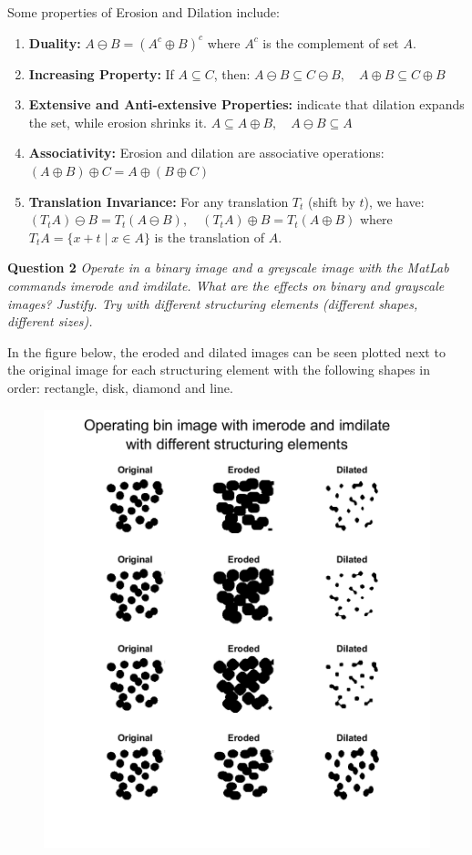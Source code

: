 Some properties of Erosion and Dilation include:
\begin{enumerate}
    \item \textbf{Duality:} 
    $A \ominus B = (A^c \oplus B)^c$ where \( A^c \) is the complement of set \( A \).

    \item \textbf{Increasing Property:} If \( A \subseteq C \), then: 
    $A \ominus B \subseteq C \ominus B, \quad A \oplus B \subseteq C \oplus B$

    \item \textbf{Extensive and Anti-extensive Properties:} indicate that dilation expands the set, while erosion shrinks it.
    $A \subseteq A \oplus B, \quad A \ominus B \subseteq A$ 

    \item \textbf{Associativity:} Erosion and dilation are associative operations: 
    $(A \oplus B) \oplus C = A \oplus (B \oplus C)$

    \item \textbf{Translation Invariance:} For any translation \( T_t \) (shift by \( t \)), we have: 
    $(T_t A) \ominus B = T_t (A \ominus B), \quad (T_t A) \oplus B = T_t (A \oplus B)$ where \( T_t A = \{ x + t \mid x \in A \} \) is the translation of \( A \).
\end{enumerate}


\newpage
\textbf{Question 2} \textit{Operate in a binary image and a greyscale image with the MatLab commands imerode and imdilate. What are the eﬀects on binary and grayscale images? Justify. Try with diﬀerent structuring elements (diﬀerent shapes, diﬀerent sizes).}

In the figure below, the eroded and dilated images can be seen plotted next to the original image for each structuring element with the following shapes in order: rectangle, disk, diamond and line. 

\begin{figure}[H]
    \centering
    \includegraphics[width=0.75\linewidth]{Doc/Graphics/Part2/part2_Question2.png}
\end{figure}


